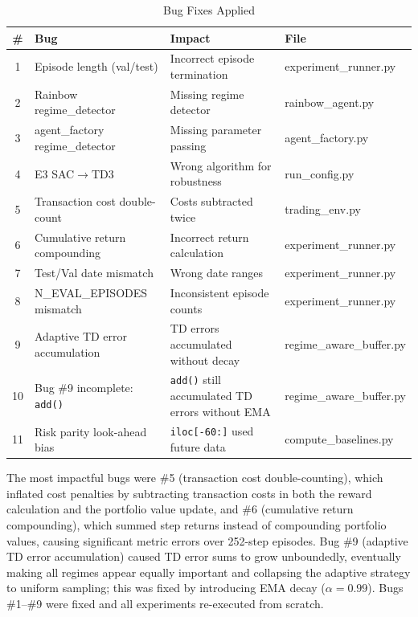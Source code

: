 \documentclass[11pt,a4paper]{article}
\begin{document}
\begin{table}[H]
\centering
\caption{Bug Fixes Applied}
\label{tab:bugs}
\begin{tabular}{clp{6cm}l}
\toprule
\textbf{\#} & \textbf{Bug} & \textbf{Impact} & \textbf{File} \\
\midrule
1 & Episode length (val/test) & Incorrect episode termination & experiment\_runner.py \\
2 & Rainbow regime\_detector & Missing regime detector & rainbow\_agent.py \\
3 & agent\_factory regime\_detector & Missing parameter passing & agent\_factory.py \\
4 & E3 SAC$\to$TD3 & Wrong algorithm for robustness & run\_config.py \\
5 & Transaction cost double-count & Costs subtracted twice & trading\_env.py \\
6 & Cumulative return compounding & Incorrect return calculation & experiment\_runner.py \\
7 & Test/Val date mismatch & Wrong date ranges & experiment\_runner.py \\
8 & N\_EVAL\_EPISODES mismatch & Inconsistent episode counts & experiment\_runner.py \\
9 & Adaptive TD error accumulation & TD errors accumulated without decay & regime\_aware\_buffer.py \\
10 & Bug \#9 incomplete: \texttt{add()} & \texttt{add()} still accumulated TD errors without EMA & regime\_aware\_buffer.py \\
11 & Risk parity look-ahead bias & \texttt{iloc[-60:]} used future data & compute\_baselines.py \\
\bottomrule
\end{tabular}
\end{table}

The most impactful bugs were \#5 (transaction cost double-counting), which inflated cost penalties by subtracting transaction costs in both the reward calculation and the portfolio value update, and \#6 (cumulative return compounding), which summed step returns instead of compounding portfolio values, causing significant metric errors over 252-step episodes. Bug \#9 (adaptive TD error accumulation) caused TD error sums to grow unboundedly, eventually making all regimes appear equally important and collapsing the adaptive strategy to uniform sampling; this was fixed by introducing EMA decay ($\alpha = 0.99$). Bugs \#1--\#9 were fixed and all experiments re-executed from scratch.
\end{document}
